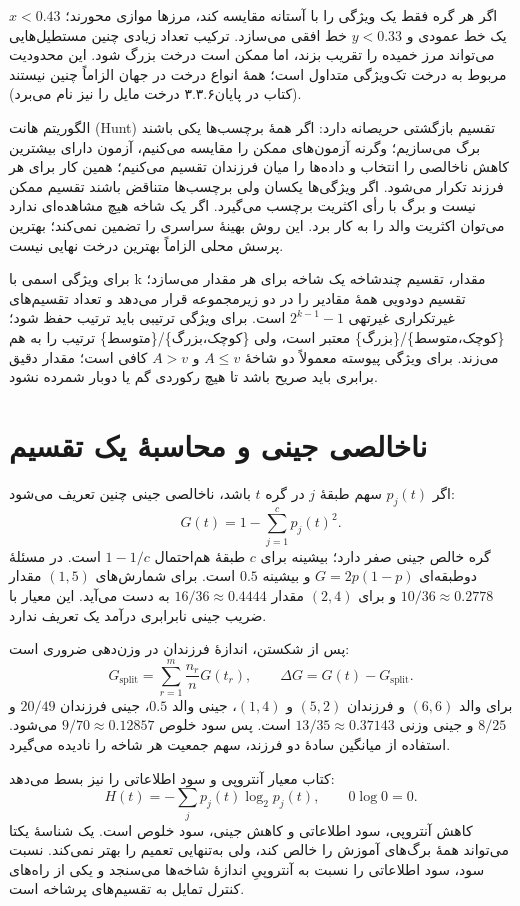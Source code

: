 \documentclass[12pt,a4paper,oneside]{report}
\begin{document}
اگر هر گره فقط یک ویژگی را با آستانه مقایسه کند، مرزها موازی محورند؛ $x<0.43$ یک خط عمودی و $y<0.33$ خط افقی می‌سازد. ترکیب تعداد زیادی چنین مستطیل‌هایی می‌تواند مرز خمیده را تقریب بزند، اما ممکن است درخت بزرگ شود. این محدودیت مربوط به درخت تک‌ویژگی متداول است؛ همهٔ انواع درخت در جهان الزاماً چنین نیستند (کتاب در پایان۳.۳.۶ درخت مایل را نیز نام می‌برد).

الگوریتم هانت (Hunt) تقسیم بازگشتی حریصانه دارد: اگر همهٔ برچسب‌ها یکی باشند برگ می‌سازیم؛ وگرنه آزمون‌های ممکن را مقایسه می‌کنیم، آزمون دارای بیشترین کاهش ناخالصی را انتخاب و داده‌ها را میان فرزندان تقسیم می‌کنیم؛ همین کار برای هر فرزند تکرار می‌شود. اگر ویژگی‌ها یکسان ولی برچسب‌ها متناقض باشند تقسیم ممکن نیست و برگ با رأی اکثریت برچسب می‌گیرد. اگر یک شاخه هیچ مشاهده‌ای ندارد می‌توان اکثریت والد را به کار برد. این روش بهینهٔ سراسری را تضمین نمی‌کند؛ بهترین پرسش محلی الزاماً بهترین درخت نهایی نیست.

برای ویژگی اسمی با k مقدار، تقسیم چندشاخه یک شاخه برای هر مقدار می‌سازد؛ تقسیم دودویی همهٔ مقادیر را در دو زیرمجموعه قرار می‌دهد و تعداد تقسیم‌های غیرتکراری غیرتهی $2^{k-1}-1$ است. برای ویژگی ترتیبی باید ترتیب حفظ شود؛ \{کوچک،متوسط\}/\{بزرگ\} معتبر است، ولی \{کوچک،بزرگ\}/\{متوسط\} ترتیب را به هم می‌زند. برای ویژگی پیوسته معمولاً دو شاخهٔ $A\le v$ و $A>v$ کافی است؛ مقدار دقیق برابری باید صریح باشد تا هیچ رکوردی گم یا دوبار شمرده نشود.

\section{ناخالصی جینی و محاسبهٔ یک تقسیم}

اگر $p_j(t)$ سهم طبقهٔ $j$ در گره $t$ باشد، ناخالصی جینی چنین تعریف می‌شود:
\[G(t)=1-\sum_{j=1}^c p_j(t)^2.\]
گره خالص جینی صفر دارد؛ بیشینه برای $c$ طبقهٔ هم‌احتمال $1-1/c$ است. در مسئلهٔ دوطبقه‌ای $G=2p(1-p)$ و بیشینه $0.5$ است. برای شمارش‌های $(1,5)$ مقدار $10/36\approx0.2778$ و برای $(2,4)$ مقدار $16/36\approx0.4444$ به دست می‌آید. این معیار با ضریب جینی نابرابری درآمد یک تعریف ندارد.

پس از شکستن، اندازهٔ فرزندان در وزن‌دهی ضروری است:
\[G_{\mathrm{split}}=\sum_{r=1}^m\frac{n_r}{n}G(t_r),\qquad \Delta G=G(t)-G_{\mathrm{split}}.\]
برای والد $(6,6)$ و فرزندان $(5,2)$ و $(1,4)$، جینی والد $0.5$، جینی فرزندان $20/49$ و $8/25$ و جینی وزنی $13/35\approx0.37143$ است. پس سود خلوص $9/70\approx0.12857$ می‌شود. استفاده از میانگین سادهٔ دو فرزند، سهم جمعیت هر شاخه را نادیده می‌گیرد.

کتاب معیار آنتروپی و سود اطلاعاتی را نیز بسط می‌دهد:
\[H(t)=-\sum_j p_j(t)\log_2p_j(t),\qquad 0\log 0=0.\]
کاهش آنتروپی، سود اطلاعاتی و کاهش جینی، سود خلوص است. یک شناسهٔ یکتا می‌تواند همهٔ برگ‌های آموزش را خالص کند، ولی به‌تنهایی تعمیم را بهتر نمی‌کند. نسبت سود، سود اطلاعاتی را نسبت به آنتروپیِ اندازهٔ شاخه‌ها می‌سنجد و یکی از راه‌های کنترل تمایل به تقسیم‌های پرشاخه است.
\end{document}
